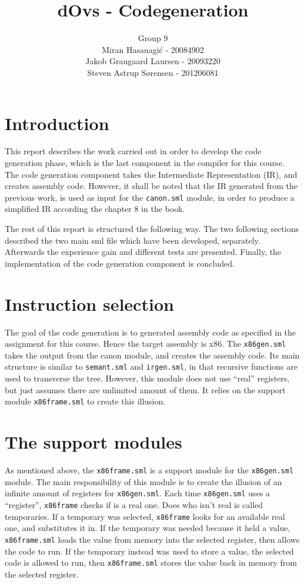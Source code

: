 \documentclass{article}
\title{dOvs - Codegeneration}
\author{
  Group 9 \\
  Miran Hasanagi\'{c} - 20084902 \\
  Jakob Graugaard Laursen - 20093220\\
  Steven Astrup S\o rensen - 201206081
}
\begin{document}
\maketitle

\section{Introduction}
This report describes the work carried out in order to develop the code generation phase, which is the last component in the compiler for this course. The code generation component takes the Intermediate Representation (IR), and creates assembly code. However, it shall be noted that the IR generated from the previous work, is used as input for the \texttt{canon.sml} module, in order to produce a simplified IR according the chapter 8 in the book.

The rest of this report is structured the following way. The two following sections described the two main sml file which have been developed, separately. Afterwards the experience gain and different tests are presented. Finally, the implementation of the code generation component is concluded.


\section{Instruction selection}

The goal of the code generation is to generated assembly code as specified in the assignment for this course. Hence the target assembly is x86. The \texttt{x86gen.sml} takes the output from the canon module, and creates the assembly code. Its main structure is similar to \texttt{semant.sml} and \texttt{irgen.sml}, in that recursive functions are used to transverse the tree. However, this module does not use ``real'' registers, but just assumes there are unlimited amount of them. It relies on the support module \texttt{x86frame.sml} to create this illusion.

\section{The support modules}
As mentioned above, the \texttt{x86frame.sml} is a support module for the \texttt{x86gen.sml} module. The main responsibility of this module is to create the illusion of an infinite amount of registers for \texttt{x86gen.sml}. Each time \texttt{x86gen.sml} uses a ``register'', \texttt{x86frame} checks if is a real one. Does who isn't real is called temporaries. If a temporary was selected, \texttt{x86frame} looks for an available real one, and substitutes it in. If the temporary was needed because it held a value, \texttt{x86frame.sml} loads the value from memory into the selected register, then allows the code to run. If the temporary instead was used to store a value, the selected code is allowed to run, then \texttt{x86frame.sml} stores the value back in memory from the selected register. 
\end{document}
